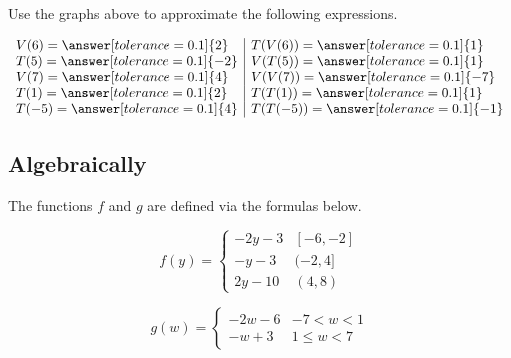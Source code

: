 \documentclass{ximera}
\begin{document}
\begin{question} 


Use the graphs above to approximate the following expressions.



\[
\begin{array}{l|l}
V(6) = \answer[tolerance=0.1]{2}  & T(V(6)) = \answer[tolerance=0.1]{1}   \\
T(5) = \answer[tolerance=0.1]{-2}  & V(T(5)) = \answer[tolerance=0.1]{1}   \\
V(7) = \answer[tolerance=0.1]{4}  & V(V(7)) = \answer[tolerance=0.1]{-7}   \\
T(1) = \answer[tolerance=0.1]{2}  & T(T(1)) = \answer[tolerance=0.1]{1}   \\
T(-5) = \answer[tolerance=0.1]{4}  & T(T(-5)) = \answer[tolerance=0.1]{-1}   \\
\end{array}
\]



\end{question}








\subsection*{Algebraically}


The functions $f$ and $g$ are defined via the formulas below.






\[
f(y) = 
\begin{cases}
  -2y-3 &  [-6, -2]   \\
  -y-3 &  (-2, 4]  \\
  2y - 10 & (4,8)
\end{cases}
\]












\[
g(w) = 
\begin{cases}
  -2w-6 &   -7 < w < 1 \\
  -w+3 &  1 \leq w < 7
\end{cases}
\]
\end{document}
